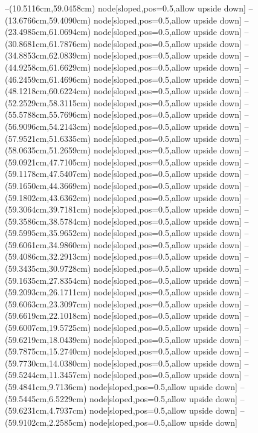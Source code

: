 --(10.5116cm,59.0458cm) node[sloped,pos=0.5,allow upside down]{\ArrowIn}
--(13.6766cm,59.4090cm) node[sloped,pos=0.5,allow upside down]{\ArrowIn}
--(23.4985cm,61.0694cm) node[sloped,pos=0.5,allow upside down]{\ArrowIn}
--(30.8681cm,61.7876cm) node[sloped,pos=0.5,allow upside down]{\ArrowIn}
--(34.8853cm,62.0839cm) node[sloped,pos=0.5,allow upside down]{\ArrowIn}
--(44.9258cm,61.6629cm) node[sloped,pos=0.5,allow upside down]{\ArrowIn}
--(46.2459cm,61.4696cm) node[sloped,pos=0.5,allow upside down]{\ArrowIn}
--(48.1218cm,60.6224cm) node[sloped,pos=0.5,allow upside down]{\ArrowIn}
--(52.2529cm,58.3115cm) node[sloped,pos=0.5,allow upside down]{\ArrowIn}
--(55.5788cm,55.7696cm) node[sloped,pos=0.5,allow upside down]{\ArrowIn}
--(56.9096cm,54.2143cm) node[sloped,pos=0.5,allow upside down]{\ArrowIn}
--(57.9521cm,51.6335cm) node[sloped,pos=0.5,allow upside down]{\ArrowIn}
--(58.0635cm,51.2659cm) node[sloped,pos=0.5,allow upside down]{\arrowIn}
--(59.0921cm,47.7105cm) node[sloped,pos=0.5,allow upside down]{\ArrowIn}
--(59.1178cm,47.5407cm) node[sloped,pos=0.5,allow upside down]{\arrowIn}
--(59.1650cm,44.3669cm) node[sloped,pos=0.5,allow upside down]{\ArrowIn}
--(59.1802cm,43.6362cm) node[sloped,pos=0.5,allow upside down]{\arrowIn}
--(59.3064cm,39.7181cm) node[sloped,pos=0.5,allow upside down]{\ArrowIn}
--(59.3586cm,38.5784cm) node[sloped,pos=0.5,allow upside down]{\ArrowIn}
--(59.5995cm,35.9652cm) node[sloped,pos=0.5,allow upside down]{\ArrowIn}
--(59.6061cm,34.9860cm) node[sloped,pos=0.5,allow upside down]{\arrowIn}
--(59.4086cm,32.2913cm) node[sloped,pos=0.5,allow upside down]{\ArrowIn}
--(59.3435cm,30.9728cm) node[sloped,pos=0.5,allow upside down]{\ArrowIn}
--(59.1635cm,27.8354cm) node[sloped,pos=0.5,allow upside down]{\ArrowIn}
--(59.2093cm,26.1711cm) node[sloped,pos=0.5,allow upside down]{\ArrowIn}
--(59.6063cm,23.3097cm) node[sloped,pos=0.5,allow upside down]{\ArrowIn}
--(59.6619cm,22.1018cm) node[sloped,pos=0.5,allow upside down]{\ArrowIn}
--(59.6007cm,19.5725cm) node[sloped,pos=0.5,allow upside down]{\ArrowIn}
--(59.6219cm,18.0439cm) node[sloped,pos=0.5,allow upside down]{\ArrowIn}
--(59.7875cm,15.2740cm) node[sloped,pos=0.5,allow upside down]{\ArrowIn}
--(59.7730cm,14.0380cm) node[sloped,pos=0.5,allow upside down]{\ArrowIn}
--(59.5244cm,11.3457cm) node[sloped,pos=0.5,allow upside down]{\ArrowIn}
--(59.4841cm,9.7136cm) node[sloped,pos=0.5,allow upside down]{\ArrowIn}
--(59.5445cm,6.5229cm) node[sloped,pos=0.5,allow upside down]{\ArrowIn}
--(59.6231cm,4.7937cm) node[sloped,pos=0.5,allow upside down]{\ArrowIn}
--(59.9102cm,2.2585cm) node[sloped,pos=0.5,allow upside down]{\ArrowIn}
